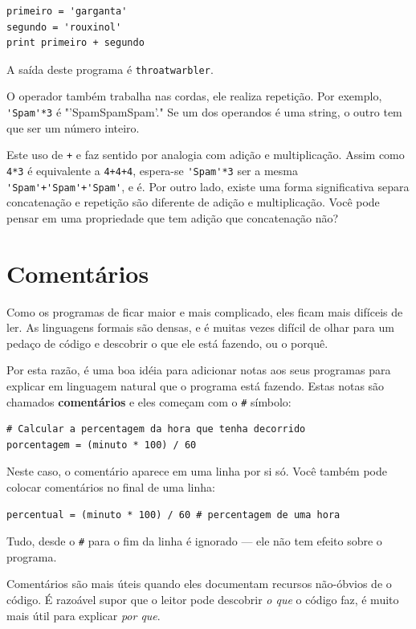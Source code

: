 \documentclass[10pt]{book}
\begin{document}
\begin{verbatim}
primeiro = 'garganta'
segundo = 'rouxinol'
print primeiro + segundo
\end{verbatim}
%
A saída deste programa é {\tt throatwarbler}.

O {\tt *} operador também trabalha nas cordas, ele realiza repetição.
Por exemplo, \verb"'Spam'*3" é \verbo"'SpamSpamSpam'." Se um dos operandos
é uma string, o outro tem que ser um número inteiro.

Este uso de {\tt +} e {\tt *} faz sentido por
analogia com adição e multiplicação. Assim como {\tt 4*3} é
equivalente a {\tt 4+4+4}, espera-se \verb"'Spam'*3" ser a mesma
\verb"'Spam'+'Spam'+'Spam'", e é. Por outro lado, existe uma
forma significativa separa concatenação e repetição são
diferente de adição e multiplicação.
Você pode pensar em uma propriedade que tem adição
que concatenação não?


\section{Comentários}

Como os programas de ficar maior e mais complicado, eles ficam mais difíceis
de ler. As linguagens formais são densas, e é muitas vezes difícil de
olhar para um pedaço de código e descobrir o que ele está fazendo, ou o porquê.

Por esta razão, é uma boa idéia para adicionar notas aos seus programas para explicar
em linguagem natural que o programa está fazendo. Estas notas são chamados
{\bf comentários} e eles começam com o \verb"#" símbolo:

\begin{verbatim}
# Calcular a percentagem da hora que tenha decorrido
porcentagem = (minuto * 100) / 60
\end{verbatim}
%
Neste caso, o comentário aparece em uma linha por si só. Você também pode colocar
comentários no final de uma linha:

\begin{verbatim}
percentual = (minuto * 100) / 60 # percentagem de uma hora
\end{verbatim}
%
Tudo, desde o {\tt \#} para o fim da linha é ignorado --- ele
não tem efeito sobre o programa.

Comentários são mais úteis quando eles documentam recursos não-óbvios de
o código. É razoável supor que o leitor pode descobrir
{\em o que} o código faz, é muito mais útil para explicar {\em por que}.
\end{document}
